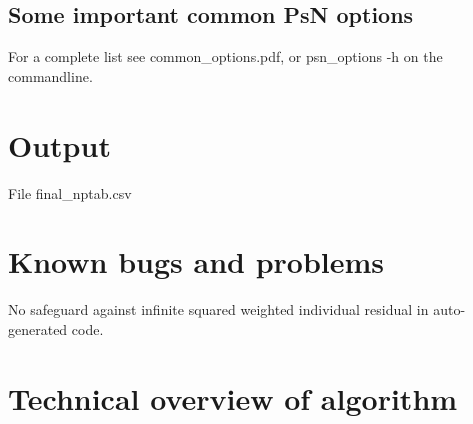 \subsection{Some important common PsN options}
For a complete list see common\_options.pdf, 
or psn\_options -h on the commandline.


\section{Output}
	
	File final\_nptab.csv
	
	\section{Known bugs and problems}
	
	No safeguard against infinite squared weighted individual residual in auto-generated code.
	
	\section{Technical overview of algorithm}
	
